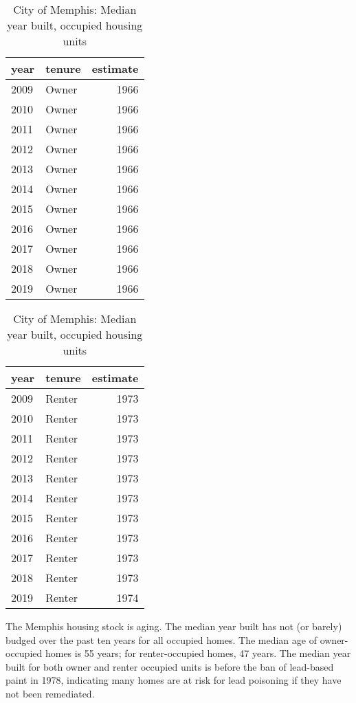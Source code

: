 \documentclass[
]{book}
\begin{document}
\begin{table}
\caption{\label{tab:medyrblt}City of Memphis: Median year built, occupied housing units}

\centering
\begin{tabular}[t]{l|l|r}
\hline
year & tenure & estimate\\
\hline
2009 & Owner & 1966\\
\hline
2010 & Owner & 1966\\
\hline
2011 & Owner & 1966\\
\hline
2012 & Owner & 1966\\
\hline
2013 & Owner & 1966\\
\hline
2014 & Owner & 1966\\
\hline
2015 & Owner & 1966\\
\hline
2016 & Owner & 1966\\
\hline
2017 & Owner & 1966\\
\hline
2018 & Owner & 1966\\
\hline
2019 & Owner & 1966\\
\hline
\end{tabular}
\centering
\begin{tabular}[t]{l|l|r}
\hline
year & tenure & estimate\\
\hline
2009 & Renter & 1973\\
\hline
2010 & Renter & 1973\\
\hline
2011 & Renter & 1973\\
\hline
2012 & Renter & 1973\\
\hline
2013 & Renter & 1973\\
\hline
2014 & Renter & 1973\\
\hline
2015 & Renter & 1973\\
\hline
2016 & Renter & 1973\\
\hline
2017 & Renter & 1973\\
\hline
2018 & Renter & 1973\\
\hline
2019 & Renter & 1974\\
\hline
\end{tabular}
\end{table}

The Memphis housing stock is aging. The median year built has not (or barely) budged over the past ten years for all occupied homes. The median age of owner-occupied homes is 55 years; for renter-occupied homes, 47 years. The median year built for both owner and renter occupied units is before the ban of lead-based paint in 1978, indicating many homes are at risk for lead poisoning if they have not been remediated.
\end{document}
